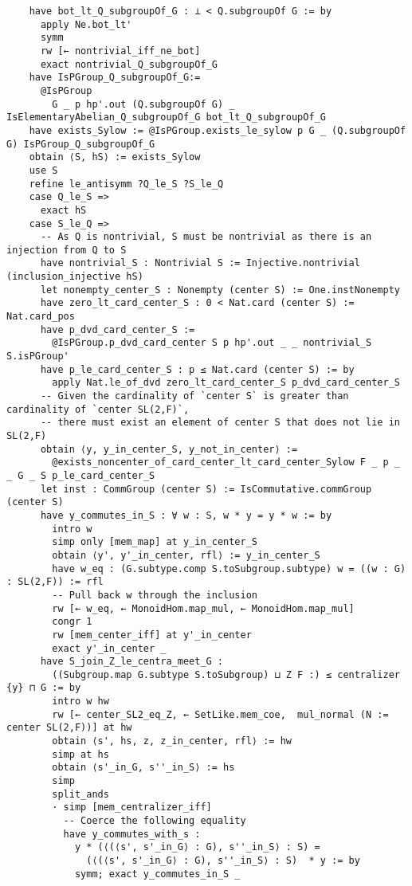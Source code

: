 \begin{tiny}
\begin{verbatim}
    have bot_lt_Q_subgroupOf_G : ⊥ < Q.subgroupOf G := by
      apply Ne.bot_lt'
      symm
      rw [← nontrivial_iff_ne_bot]
      exact nontrivial_Q_subgroupOf_G
    have IsPGroup_Q_subgroupOf_G:=
      @IsPGroup
        G _ p hp'.out (Q.subgroupOf G) _ IsElementaryAbelian_Q_subgroupOf_G bot_lt_Q_subgroupOf_G
    have exists_Sylow := @IsPGroup.exists_le_sylow p G _ (Q.subgroupOf G) IsPGroup_Q_subgroupOf_G
    obtain ⟨S, hS⟩ := exists_Sylow
    use S
    refine le_antisymm ?Q_le_S ?S_le_Q
    case Q_le_S =>
      exact hS
    case S_le_Q =>
      -- As Q is nontrivial, S must be nontrivial as there is an injection from Q to S
      have nontrivial_S : Nontrivial S := Injective.nontrivial (inclusion_injective hS)
      let nonempty_center_S : Nonempty (center S) := One.instNonempty
      have zero_lt_card_center_S : 0 < Nat.card (center S) := Nat.card_pos
      have p_dvd_card_center_S :=
        @IsPGroup.p_dvd_card_center S p hp'.out _ _ nontrivial_S S.isPGroup'
      have p_le_card_center_S : p ≤ Nat.card (center S) := by
        apply Nat.le_of_dvd zero_lt_card_center_S p_dvd_card_center_S
      -- Given the cardinality of `center S` is greater than cardinality of `center SL(2,F)`,
      -- there must exist an element of center S that does not lie in SL(2,F)
      obtain ⟨y, y_in_center_S, y_not_in_center⟩ :=
        @exists_noncenter_of_card_center_lt_card_center_Sylow F _ p _ _ G _ S p_le_card_center_S
      let inst : CommGroup (center S) := IsCommutative.commGroup (center S)
      have y_commutes_in_S : ∀ w : S, w * y = y * w := by
        intro w
        simp only [mem_map] at y_in_center_S
        obtain ⟨y', y'_in_center, rfl⟩ := y_in_center_S
        have w_eq : (G.subtype.comp S.toSubgroup.subtype) w = ((w : G) : SL(2,F)) := rfl
        -- Pull back w through the inclusion
        rw [← w_eq, ← MonoidHom.map_mul, ← MonoidHom.map_mul]
        congr 1
        rw [mem_center_iff] at y'_in_center
        exact y'_in_center _
      have S_join_Z_le_centra_meet_G :
        ((Subgroup.map G.subtype S.toSubgroup) ⊔ Z F :) ≤ centralizer {y} ⊓ G := by
        intro w hw
        rw [← center_SL2_eq_Z, ← SetLike.mem_coe,  mul_normal (N := center SL(2,F))] at hw
        obtain ⟨s', hs, z, z_in_center, rfl⟩ := hw
        simp at hs
        obtain ⟨s'_in_G, s''_in_S⟩ := hs
        simp
        split_ands
        · simp [mem_centralizer_iff]
          -- Coerce the following equality
          have y_commutes_with_s :
            y * (⟨(⟨s', s'_in_G⟩ : G), s''_in_S⟩ : S) =
              (⟨(⟨s', s'_in_G⟩ : G), s''_in_S⟩ : S)  * y := by
            symm; exact y_commutes_in_S _

\end{verbatim}
\end{tiny}
